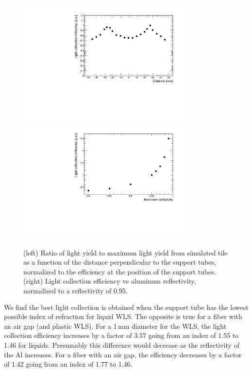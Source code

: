 \documentclass[review]{elsarticle}
\begin{document}
\begin{figure}[!ht]
\begin{center}
\includegraphics[width=0.8\textwidth]{./figures/geant_uniformity_plot.pdf}
\includegraphics[width=0.8\textwidth]{./figures/geant_reflectivity_plot.pdf}
\caption{(left) Ratio of light yield to maximum light yield from
  simulated tile as a function of the distance perpendicular to the
  support tubes, normalized to the efficiency at the position of the support tubes.
    (right) Light collection efficiency vs aluminum
  reflectivity, normalized to a reflectivity of 0.95.
  }
\label{fig:simeff}
\end{center}
\end{figure}


We find the best light collection is obtained when the support tube has the
lowest possible index of refraction for liquid WLS. The opposite is
true for a fiber with an air gap (and plastic WLS). For a 1\,mm
diameter for the WLS, the light collection efficiency increases by a
factor of 3.57 going from an
index of 1.55 to 1.46 for liquids. Presumably this difference would
decrease as the reflectivity of the Al increases. For a fiber with an
air gap, the efficiency decreases by a factor of 1.42 going from an index of 1.77 to 1.46.
\end{document}

